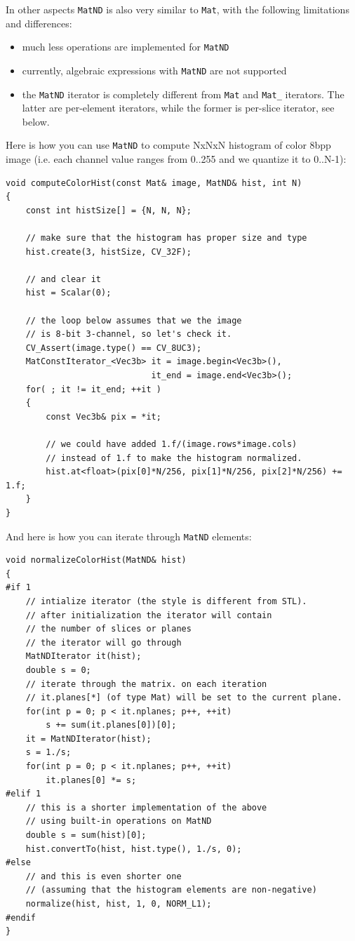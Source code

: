In other aspects \texttt{MatND} is also very similar to \texttt{Mat}, with the following limitations and differences:
\begin{itemize}
    \item much less operations are implemented for \texttt{MatND}
    \item currently, algebraic expressions with \texttt{MatND} are not supported
    \item the \texttt{MatND} iterator is completely different from \texttt{Mat} and \texttt{Mat\_} iterators. The latter are per-element iterators, while the former is per-slice iterator, see below.
\end{itemize}

Here is how you can use \texttt{MatND} to compute NxNxN histogram of color 8bpp image (i.e. each channel value ranges from 0..255 and we quantize it to 0..N-1):

\begin{lstlisting}
void computeColorHist(const Mat& image, MatND& hist, int N)
{
    const int histSize[] = {N, N, N};
    
    // make sure that the histogram has proper size and type
    hist.create(3, histSize, CV_32F);
    
    // and clear it
    hist = Scalar(0);
    
    // the loop below assumes that we the image
    // is 8-bit 3-channel, so let's check it.
    CV_Assert(image.type() == CV_8UC3);
    MatConstIterator_<Vec3b> it = image.begin<Vec3b>(),
                             it_end = image.end<Vec3b>();    
    for( ; it != it_end; ++it )
    {
        const Vec3b& pix = *it;
        
        // we could have added 1.f/(image.rows*image.cols)
        // instead of 1.f to make the histogram normalized.
        hist.at<float>(pix[0]*N/256, pix[1]*N/256, pix[2]*N/256) += 1.f;
    }
}
\end{lstlisting}

And here is how you can iterate through \texttt{MatND} elements:

\begin{lstlisting}
void normalizeColorHist(MatND& hist)
{
#if 1    
    // intialize iterator (the style is different from STL).
    // after initialization the iterator will contain
    // the number of slices or planes
    // the iterator will go through
    MatNDIterator it(hist);
    double s = 0;
    // iterate through the matrix. on each iteration
    // it.planes[*] (of type Mat) will be set to the current plane.
    for(int p = 0; p < it.nplanes; p++, ++it)
        s += sum(it.planes[0])[0];
    it = MatNDIterator(hist);
    s = 1./s;
    for(int p = 0; p < it.nplanes; p++, ++it)
        it.planes[0] *= s;
#elif 1
    // this is a shorter implementation of the above
    // using built-in operations on MatND
    double s = sum(hist)[0];
    hist.convertTo(hist, hist.type(), 1./s, 0);
#else
    // and this is even shorter one
    // (assuming that the histogram elements are non-negative)
    normalize(hist, hist, 1, 0, NORM_L1);
#endif
}
\end{lstlisting}

